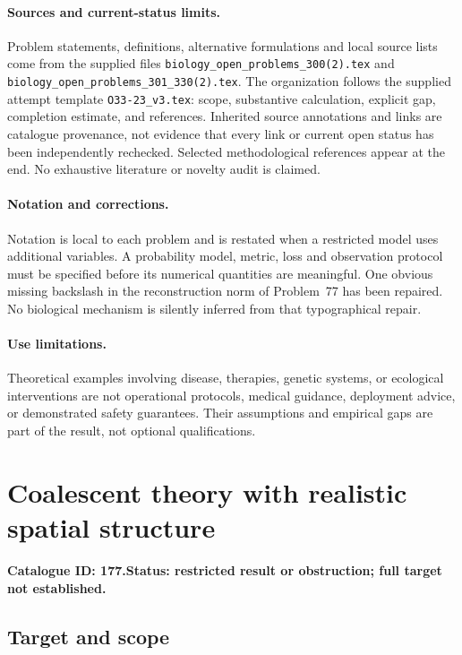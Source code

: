 \documentclass[11pt]{article}
\begin{document}
\paragraph{Sources and current-status limits.}
Problem statements, definitions, alternative formulations and local source lists
come from the supplied files
\texttt{biology\_open\_problems\_300(2).tex} and
\texttt{biology\_open\_problems\_301\_330(2).tex}.
The organization follows the supplied attempt template
\texttt{O33-23\_v3.tex}: scope, substantive calculation, explicit gap,
completion estimate, and references. Inherited source annotations and links are
catalogue provenance, not evidence that every link or current open status has
been independently rechecked. Selected methodological references appear at the
end. No exhaustive literature or novelty audit is claimed.

\paragraph{Notation and corrections.}
Notation is local to each problem and is restated when a restricted model uses
additional variables. A probability model, metric, loss and observation protocol
must be specified before its numerical quantities are meaningful. One obvious
missing backslash in the reconstruction norm of Problem~77 has been repaired.
No biological mechanism is silently inferred from that typographical repair.

\paragraph{Use limitations.}
Theoretical examples involving disease, therapies, genetic systems, or ecological
interventions are not operational protocols, medical guidance, deployment advice,
or demonstrated safety guarantees. Their assumptions and empirical gaps are part
of the result, not optional qualifications.

\setcounter{section}{176}
\section{Coalescent theory with realistic spatial structure}
\label{prob:177}
\noindent\textbf{Catalogue ID: 177.}\quad \textbf{Status: restricted result or obstruction; full target not established.}
\subsection{Target and scope}
\end{document}
